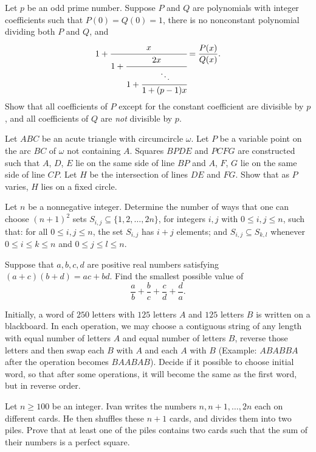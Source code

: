 \documentclass[11pt]{scrartcl}
\begin{document}
\begin{problem}[57065759079551]
Let $p$ be an odd prime number. Suppose $P$ and $Q$ are polynomials with integer coefficients such that $P(0)=Q(0)=1$, there is no nonconstant polynomial dividing both $P$ and $Q$, and
\[
  1 + \cfrac{x}{1 + \cfrac{2x}{1 + \cfrac{\ddots}{1 +
  (p-1)x}}}=\frac{P(x)}{Q(x)}.
\]Show that all coefficients of $P$ except for the constant coefficient are divisible by $p$, and all coefficients of $Q$ are \emph{not} divisible by $p$.
\end{problem}
\begin{problem}[8700998965901287095]
Let \(ABC\) be an acute triangle with circumcircle \(\omega\). Let \(P\) be a variable point on the arc \(BC\) of \(\omega\) not containing \(A\). Squares \(BPDE\) and \(PCFG\) are constructed such that \(A\), \(D\), \(E\) lie on the same side of line \(BP\) and \(A\), \(F\), \(G\) lie on the same side of line \(CP\). Let \(H\) be the intersection of lines \(DE\) and \(FG\). Show that as \(P\) varies, \(H\) lies on a fixed circle.
\end{problem}
\begin{problem}[141955509989127]
Let $n$ be a nonnegative integer. Determine the number of ways that one can choose $(n+1)^2$ sets $S_{i,j}\subseteq\{1,2,\ldots,2n\}$, for integers $i,j$ with $0\leq i,j\leq n$, such that:
for all $0\leq i,j\leq n$, the set $S_{i,j}$ has $i+j$ elements; and
$S_{i,j}\subseteq S_{k,l}$ whenever $0\leq i\leq k\leq n$ and $0\leq j\leq l\leq n$.
\end{problem}
\begin{problem}[132497611943266]
Suppose that $a,b,c,d$ are positive real numbers satisfying $(a+c)(b+d)=ac+bd$. Find the smallest possible value of
$$\frac{a}{b}+\frac{b}{c}+\frac{c}{d}+\frac{d}{a}.$$
\end{problem}
\begin{problem}[6497483389877629432]
Initially, a word of $250$ letters with $125$ letters $A$ and $125$ letters $B$ is written on a blackboard. In each operation, we may choose a contiguous string of any length with equal number of letters $A$ and equal number of letters $B$, reverse those letters and then swap each $B$ with $A$ and each $A$ with $B$ (Example: $ABABBA$ after the operation becomes $BAABAB$). Decide if it possible to choose initial word, so that after some operations, it will become the same as the first word, but in reverse order.
\end{problem}
\begin{problem}[258585206260584]
Let $n \geqslant 100$ be an integer. Ivan writes the numbers $n, n+1, \ldots, 2 n$ each on different cards. He then shuffles these $n+1$ cards, and divides them into two piles. Prove that at least one of the piles contains two cards such that the sum of their numbers is a perfect square.
\end{problem}
\end{document}

